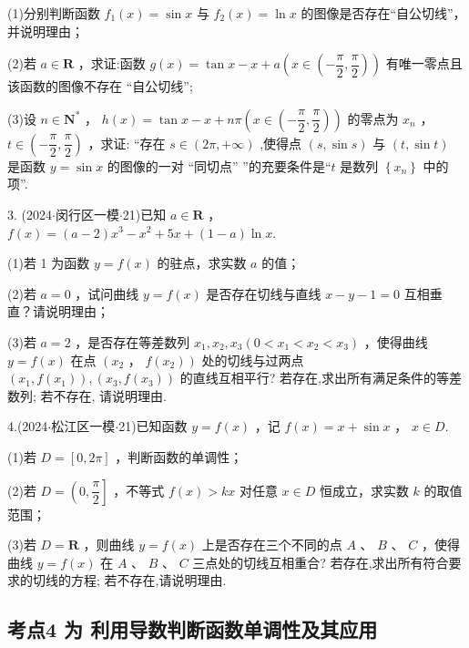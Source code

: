 (1)分别判断函数 ${f}_{1}\left( x\right)  = \sin x$ 与 ${f}_{2}\left( x\right)  = \ln x$ 的图像是否存在“自公切线”，并说明理由；

(2)若 $a \in  \mathbf{R}$ ，求证:函数 $g\left( x\right)  = \tan x - x + a\left( {x \in  \left( {-\dfrac{\pi }{2},\dfrac{\pi }{2}}\right) }\right)$ 有唯一零点且该函数的图像不存在 “自公切线”;

(3)设 $n \in  {\mathbf{N}}^{ * }$ ， $h\left( x\right)  = \tan x - x + {n\pi }\left( {x \in  \left( {-\dfrac{\pi }{2},\dfrac{\pi }{2}}\right) }\right)$ 的零点为 ${x}_{n}$ ， $t \in  \left( {-\dfrac{\pi }{2},\dfrac{\pi }{2}}\right)$ ，求证: “存在 $s \in  \left( {{2\pi }, + \infty }\right)$ ,使得点 $\left( {s,\sin s}\right)$ 与 $\left( {t,\sin t}\right)$ 是函数 $y = \sin x$ 的图像的一对 “同切点” ”的充要条件是“$t$ 是数列 $\left\{  {x}_{n}\right\}$ 中的项”.

3. (2024$\cdot$闵行区一模$\cdot$21)已知 $a \in  \mathbf{R}$ ， $f\left( x\right)  = \left( {a - 2}\right) {x}^{3} - {x}^{2} + {5x} + \left( {1 - a}\right) \ln x$.

(1)若 1 为函数 $y = f\left( x\right)$ 的驻点，求实数 $a$ 的值；

(2)若 $a = 0$ ，试问曲线 $y = f\left( x\right)$ 是否存在切线与直线 $x - y - 1 = 0$ 互相垂直？请说明理由；

(3)若 $a = 2$ ，是否存在等差数列 ${x}_{1},{x}_{2},{x}_{3}\left( {0 < {x}_{1} < {x}_{2} < {x}_{3}}\right)$ ，使得曲线 $y = f\left( x\right)$ 在点 $\left( {x}_{2}\right.$ ， $\left. {f\left( {x}_{2}\right) }\right)$ 处的切线与过两点 $\left( {{x}_{1},f\left( {x}_{1}\right) }\right) ,\left( {{x}_{3},f\left( {x}_{3}\right) }\right)$ 的直线互相平行? 若存在,求出所有满足条件的等差数列; 若不存在, 请说明理由.

4.(2024$\cdot$松江区一模$\cdot$21)已知函数 $y = f\left( x\right)$ ，记 $f\left( x\right)  = x + \sin x$ ， $x \in  D$.

(1)若 $D = \left\lbrack  {0,{2\pi }}\right\rbrack$ ，判断函数的单调性；

(2)若 $D = \left( {0,\dfrac{\pi }{2}}\right\rbrack$ ，不等式 $f\left( x\right)  > {kx}$ 对任意 $x \in  D$ 恒成立，求实数 $k$ 的取值范围；

(3)若 $D = \mathbf{R}$ ，则曲线 $y = f\left( x\right)$ 上是否存在三个不同的点 $A$ 、 $B$ 、 $C$ ，使得曲线 $y = f\left( x\right)$ 在 $A$ 、 $B$ 、 $C$ 三点处的切线互相重合? 若存在,求出所有符合要求的切线的方程; 若不存在,请说明理由.

\subsection*{考点4 为 利用导数判断函数单调性及其应用}

